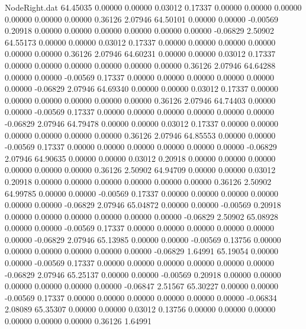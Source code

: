 \begin{filecontents}{NodeRight.dat}
  64.45035    0.00000    0.00000     0.03012    0.17337    0.00000    0.00000    0.00000    0.00000    0.00000    0.00000    0.36126    2.07946
  64.50101    0.00000    0.00000    -0.00569    0.20918    0.00000    0.00000    0.00000    0.00000    0.00000    0.00000   -0.06829    2.50902
  64.55173    0.00000    0.00000     0.03012    0.17337    0.00000    0.00000    0.00000    0.00000    0.00000    0.00000    0.36126    2.07946
  64.60231    0.00000    0.00000     0.03012    0.17337    0.00000    0.00000    0.00000    0.00000    0.00000    0.00000    0.36126    2.07946
  64.64288    0.00000    0.00000    -0.00569    0.17337    0.00000    0.00000    0.00000    0.00000    0.00000    0.00000   -0.06829    2.07946
  64.69340    0.00000    0.00000     0.03012    0.17337    0.00000    0.00000    0.00000    0.00000    0.00000    0.00000    0.36126    2.07946
  64.74403    0.00000    0.00000    -0.00569    0.17337    0.00000    0.00000    0.00000    0.00000    0.00000    0.00000   -0.06829    2.07946
  64.79478    0.00000    0.00000     0.03012    0.17337    0.00000    0.00000    0.00000    0.00000    0.00000    0.00000    0.36126    2.07946
  64.85553    0.00000    0.00000    -0.00569    0.17337    0.00000    0.00000    0.00000    0.00000    0.00000    0.00000   -0.06829    2.07946
  64.90635    0.00000    0.00000     0.03012    0.20918    0.00000    0.00000    0.00000    0.00000    0.00000    0.00000    0.36126    2.50902
  64.94709    0.00000    0.00000     0.03012    0.20918    0.00000    0.00000    0.00000    0.00000    0.00000    0.00000    0.36126    2.50902
  64.99785    0.00000    0.00000    -0.00569    0.17337    0.00000    0.00000    0.00000    0.00000    0.00000    0.00000   -0.06829    2.07946
  65.04872    0.00000    0.00000    -0.00569    0.20918    0.00000    0.00000    0.00000    0.00000    0.00000    0.00000   -0.06829    2.50902
  65.08928    0.00000    0.00000    -0.00569    0.17337    0.00000    0.00000    0.00000    0.00000    0.00000    0.00000   -0.06829    2.07946
  65.13985    0.00000    0.00000    -0.00569    0.13756    0.00000    0.00000    0.00000    0.00000    0.00000    0.00000   -0.06829    1.64991
  65.19054    0.00000    0.00000    -0.00569    0.17337    0.00000    0.00000    0.00000    0.00000    0.00000    0.00000   -0.06829    2.07946
  65.25137    0.00000    0.00000    -0.00569    0.20918    0.00000    0.00000    0.00000    0.00000    0.00000    0.00000   -0.06847    2.51567
  65.30227    0.00000    0.00000    -0.00569    0.17337    0.00000    0.00000    0.00000    0.00000    0.00000    0.00000   -0.06834    2.08089
  65.35307    0.00000    0.00000     0.03012    0.13756    0.00000    0.00000    0.00000    0.00000    0.00000    0.00000    0.36126    1.64991

\end{filecontents}
